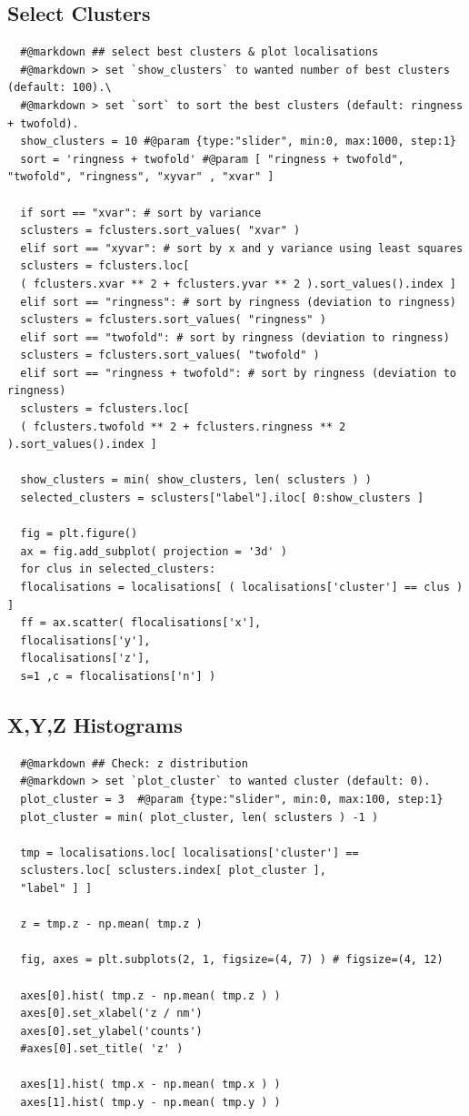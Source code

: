 \documentclass[11pt, a4paper, oneside, twocolumn]{report}
\begin{document}
\subsection{Select Clusters}

\begin{verbatim}
  #@markdown ## select best clusters & plot localisations
  #@markdown > set `show_clusters` to wanted number of best clusters (default: 100).\
  #@markdown > set `sort` to sort the best clusters (default: ringness + twofold).
  show_clusters = 10 #@param {type:"slider", min:0, max:1000, step:1}
  sort = 'ringness + twofold' #@param [ "ringness + twofold", "twofold", "ringness", "xyvar" , "xvar" ]

  if sort == "xvar": # sort by variance
  sclusters = fclusters.sort_values( "xvar" )
  elif sort == "xyvar": # sort by x and y variance using least squares
  sclusters = fclusters.loc[
  ( fclusters.xvar ** 2 + fclusters.yvar ** 2 ).sort_values().index ]
  elif sort == "ringness": # sort by ringness (deviation to ringness)
  sclusters = fclusters.sort_values( "ringness" )
  elif sort == "twofold": # sort by ringness (deviation to ringness)
  sclusters = fclusters.sort_values( "twofold" )
  elif sort == "ringness + twofold": # sort by ringness (deviation to ringness)
  sclusters = fclusters.loc[
  ( fclusters.twofold ** 2 + fclusters.ringness ** 2 ).sort_values().index ]

  show_clusters = min( show_clusters, len( sclusters ) )
  selected_clusters = sclusters["label"].iloc[ 0:show_clusters ]

  fig = plt.figure()
  ax = fig.add_subplot( projection = '3d' )
  for clus in selected_clusters:
  flocalisations = localisations[ ( localisations['cluster'] == clus ) ]
  ff = ax.scatter( flocalisations['x'],
  flocalisations['y'],
  flocalisations['z'],
  s=1 ,c = flocalisations['n'] )
\end{verbatim}


\subsection{X,Y,Z Histograms}

\begin{verbatim}
  #@markdown ## Check: z distribution
  #@markdown > set `plot_cluster` to wanted cluster (default: 0).
  plot_cluster = 3  #@param {type:"slider", min:0, max:100, step:1}
  plot_cluster = min( plot_cluster, len( sclusters ) -1 )

  tmp = localisations.loc[ localisations['cluster'] == 
  sclusters.loc[ sclusters.index[ plot_cluster ],
  "label" ] ]

  z = tmp.z - np.mean( tmp.z )

  fig, axes = plt.subplots(2, 1, figsize=(4, 7) ) # figsize=(4, 12)

  axes[0].hist( tmp.z - np.mean( tmp.z ) )
  axes[0].set_xlabel('z / nm')
  axes[0].set_ylabel('counts')
  #axes[0].set_title( 'z' )

  axes[1].hist( tmp.x - np.mean( tmp.x ) )
  axes[1].hist( tmp.y - np.mean( tmp.y ) )
\end{verbatim}
\end{document}
